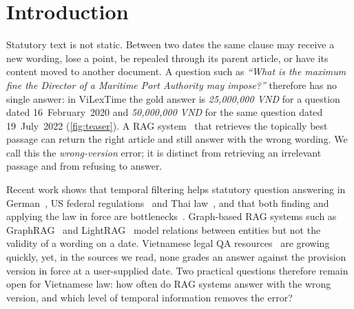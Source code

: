 \documentclass[conference]{IEEEtran}
\newcommand{\vi}[1]{\textit{#1}}
\begin{document}
\section{Introduction}
\label{sec:intro}

Statutory text is not static. Between two dates the same clause may receive a new wording, lose a point, be repealed through its parent article, or have its content moved to another document. A question such as \vi{``What is the maximum fine the Director of a Maritime Port Authority may impose?''} therefore has no single answer: in ViLexTime the gold answer is \vi{25{,}000{,}000 VND} for a question dated 16~February~2020 and \vi{50{,}000{,}000 VND} for the same question dated 19~July~2022 (\cref{fig:teaser}). A RAG system~\cite{lewis2020rag} that retrieves the topically best passage can return the right article and still answer with the wrong wording. We call this the \emph{wrong-version} error; it is distinct from retrieving an irrelevant passage and from refusing to answer.

Recent work shows that temporal filtering helps statutory question answering in German~\cite{prior2026oldfriend}, US federal regulations~\cite{yao2026lawinforce} and Thai law~\cite{akarajaradwong2026nitibenchplus}, and that both finding and applying the law in force are bottlenecks~\cite{yao2026lawinforce}. Graph-based RAG systems such as GraphRAG~\cite{edge2024graphrag} and LightRAG~\cite{guo2025lightrag} model relations between entities but not the validity of a wording on a date. Vietnamese legal QA resources~\cite{thanh2021alqac,nguyen2025vlqa,nguyen2026vihermes,dong2026vietlegal,nguyen2026vilegalexpert} are growing quickly, yet, in the sources we read, none grades an answer against the provision version in force at a user-supplied date. Two practical questions therefore remain open for Vietnamese law: how often do RAG systems answer with the wrong version, and which level of temporal information removes the error?
\end{document}
